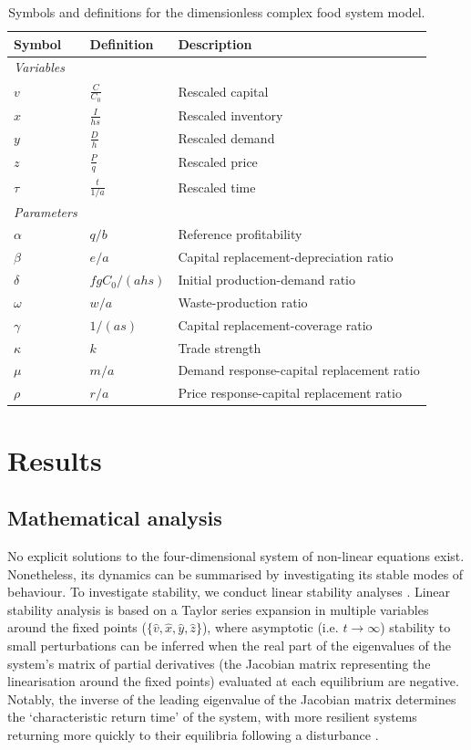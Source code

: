 \documentclass[9pt,twocolumn,twoside,lineno]{pnas-new}
\begin{document}
\begin{table}[t!]
  \centering
  \footnotesize
  \begin{tabular}{lll}
    \textbf{Symbol} & \textbf{Definition} & \textbf{Description} \\ \midrule
    \textit{Variables} &\\
    $v$  & $\frac{C}{C_0}$    & Rescaled capital        \\
    $x$  & $\frac{I}{hs}$  & Rescaled inventory      \\
    $y$  & $\frac{D}{h}$  & Rescaled demand             \\
    $z$  & $\frac{P}{q}$  & Rescaled price               \\
    $\tau$  & $\frac{t}{1/a}$  & Rescaled time\\
    \textit{Parameters} &\\
    $\alpha$   & $q/b$  & Reference profitability\\
    $\beta$    & $e/a$  & Capital replacement-depreciation ratio\\
    $\delta$    & $f g C_{0}/(ahs)$ & Initial production-demand ratio\\
    $\omega$    & $w/a$ & Waste-production ratio\\
    $\gamma$    & $1/(as)$ & Capital replacement-coverage ratio\\
    $\kappa$    & $k$    & Trade strength \\
    $\mu$       & $m/a$  & Demand response-capital replacement ratio\\
    $\rho$      & $r/a$  & Price response-capital replacement ratio\\
    \bottomrule
  \end{tabular}
  \caption{Symbols and definitions for the dimensionless complex food system model.}
  \label{table:t_nd_symbols}
\end{table}

\section*{Results}

\subsection*{Mathematical analysis}
No explicit solutions to the four-dimensional system of non-linear equations exist. Nonetheless, its dynamics can be summarised by investigating its stable modes of behaviour. To investigate stability, we conduct linear stability analyses \cite{strogatz1994}. Linear stability analysis is based on a Taylor series expansion in multiple variables around the fixed points ($\{\hat{v}, \hat{x}, \hat{y}, \hat{z}\}$), where asymptotic (i.e. $t \rightarrow \infty$) stability to small perturbations can be inferred when the real part of the eigenvalues of the system's matrix of partial derivatives (the Jacobian matrix representing the linearisation around the fixed points) evaluated at each equilibrium are negative. Notably, the inverse of the leading eigenvalue of the Jacobian matrix determines the `characteristic return time' of the system, with more resilient systems returning more quickly to their equilibria following a disturbance \cite{pimm1984}.
\end{document}
